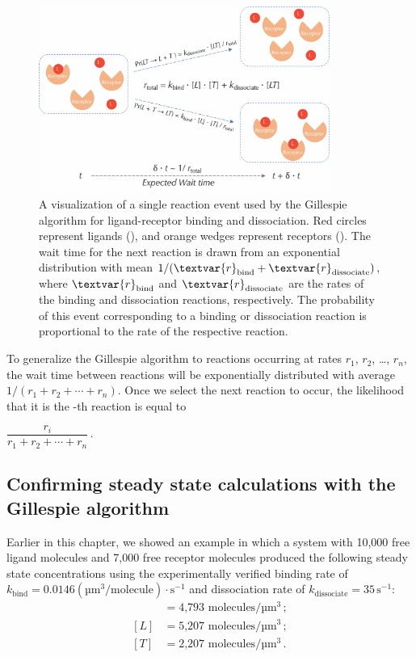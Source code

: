 \begin{figure}[h]
\centering
\mySfFamily
\includegraphics[width = 0.85\textwidth]{../images_CMYK/chemotaxis_visualizessa}
\caption{A visualization of a single reaction event used by the Gillespie algorithm for ligand-receptor binding and dissociation. Red circles represent ligands (), and orange wedges represent receptors (). The wait time for the next reaction is drawn from an exponential distribution with mean $\text{1}/(\textvar{r}_\text{bind} + \textvar{r}_\text{dissociate})$, where $\textvar{r}_\text{bind}$ and $\textvar{r}_\text{dissociate}$ are the rates of the binding and dissociation reactions, respectively. The probability of this event corresponding to a binding or dissociation reaction is proportional to the rate of the respective reaction.}
\label{fig:chemotaxis_visualizessa}
\end{figure}

To generalize the Gillespie algorithm to  reactions occurring at rates $r_1$, $r_2$, \ldots, $r_n$, the wait time between reactions will be exponentially distributed with average $1 / (r_1 + r_2 + \cdots + r_n)$. Once we select the next reaction to occur, the likelihood that it is the -th reaction is equal to

\begin{center}
$\dfrac{r_i}{r_1 + r_2 + \cdots + r_n}$\,.
\end{center}


\FloatBarrier
{}
\subsection{Confirming steady state calculations with the Gillespie algorithm}

Earlier in this chapter, we showed an example in which a system with 10,000 free ligand molecules and 7,000 free receptor molecules produced the following steady state concentrations using the experimentally verified binding rate of $k_\text{bind} = 0.0146 (\text{µm}^3/\text{molecule}) \cdot \text{s}^{-1}$ and dissociation rate of $k_\text{dissociate} = 35\,\text{s}^{-1}$:
\begin{align*}
[LT] & = \text{4,793 molecules}/\text{µm}^3\,;\\
[L] & = \text{5,207 molecules}/\text{µm}^3\,;\\
[T] & = \text{2,207 molecules}/\text{µm}^3\,.
\end{align*}

